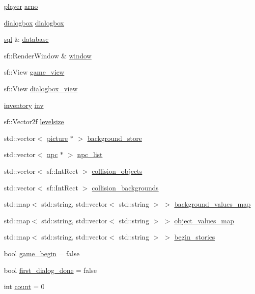 \begin{DoxyCompactItemize}
\item 
\hyperlink{classplayer}{player} \hyperlink{classgame_abea612890f55555c354cb24bd521b784}{arno}
\item 
\hyperlink{classdialogbox}{dialogbox} \hyperlink{classgame_a2ea8501912521b1b00dcd29284039234}{dialogbox}
\item 
\hyperlink{classsql}{sql} \& \hyperlink{classgame_aa6c2206b4735cd2c90f934384c350e0a}{database}
\item 
sf\+::\+Render\+Window \& \hyperlink{classgame_af7435cad08a8114c7598bc99f5b6496e}{window}
\item 
sf\+::\+View \hyperlink{classgame_ac607d12774a2ebf6fb3cf24a60f47fed}{game\+\_\+view}
\item 
sf\+::\+View \hyperlink{classgame_aead46333e3eb81e970a9d10d0b2481c9}{dialogbox\+\_\+view}
\item 
\hyperlink{classinventory}{inventory} \hyperlink{classgame_a4bfc9c9555fc75525ba0d8719827e749}{inv}
\item 
sf\+::\+Vector2f \hyperlink{classgame_abccd2ff11b53d33fde0ee8ab50c29972}{levelsize}
\item 
std\+::vector$<$ \hyperlink{classpicture}{picture} $\ast$ $>$ \hyperlink{classgame_ad39555b6aeb922c481a4f37500280d96}{background\+\_\+store}
\item 
std\+::vector$<$ \hyperlink{classnpc}{npc} $\ast$ $>$ \hyperlink{classgame_af427a7b929715c637cb10a4894386ead}{npc\+\_\+list}
\item 
std\+::vector$<$ sf\+::\+Int\+Rect $>$ \hyperlink{classgame_ab83d40295556a456fd5f976335609ab1}{collision\+\_\+objects}
\item 
std\+::vector$<$ sf\+::\+Int\+Rect $>$ \hyperlink{classgame_a961d3da89b2af402aff6c9f7c2a2b81c}{collision\+\_\+backgrounds}
\item 
std\+::map$<$ std\+::string, std\+::vector$<$ std\+::string $>$ $>$ \hyperlink{classgame_a839db13cc77624fa6a671b46bbf02b28}{background\+\_\+values\+\_\+map}
\item 
std\+::map$<$ std\+::string, std\+::vector$<$ std\+::string $>$ $>$ \hyperlink{classgame_a7fcd329ec94a2aa84d486e67978d417a}{object\+\_\+values\+\_\+map}
\item 
std\+::map$<$ std\+::string, std\+::vector$<$ std\+::string $>$ $>$ \hyperlink{classgame_a601fdbb561a442a318906ad9b57536f0}{begin\+\_\+stories}
\item 
bool \hyperlink{classgame_ae82c66167f3bf9cd4892a9e0ec6c3ba6}{game\+\_\+begin} = false
\item 
bool \hyperlink{classgame_ac28a00d246bdb9b92858bd876c6edd0e}{first\+\_\+dialog\+\_\+done} = false
\item 
int \hyperlink{classgame_a278222f919fb52fb2f87e45be40fb571}{count} = 0
\end{DoxyCompactItemize}


